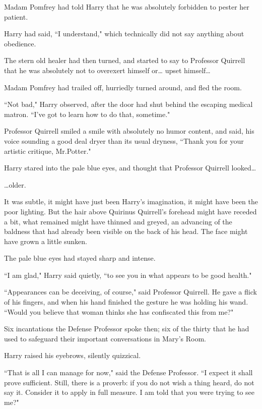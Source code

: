 Madam Pomfrey had told Harry that he was absolutely forbidden to pester her patient.

Harry had said, ``I understand," which technically did not say anything about obedience.

The stern old healer had then turned, and started to say to Professor Quirrell that he was absolutely not to overexert himself or{\ldots} upset himself{\ldots}

Madam Pomfrey had trailed off, hurriedly turned around, and fled the room.

``Not bad," Harry observed, after the door had shut behind the escaping medical matron. ``I've got to learn how to do that, sometime."

Professor Quirrell smiled a smile with absolutely no humor content, and said, his voice sounding a good deal dryer than its usual dryness, ``Thank you for your artistic critique, Mr.\?Potter."

Harry stared into the pale blue eyes, and thought that Professor Quirrell looked{\ldots}

{\ldots}older.

It was subtle, it might have just been Harry's imagination, it might have been the poor lighting. But the hair above Quirinus Quirrell's forehead might have receded a bit, what remained might have thinned and greyed, an advancing of the baldness that had already been visible on the back of his head. The face might have grown a little sunken.

The pale blue eyes had stayed sharp and intense.

``I am glad," Harry said quietly, ``to see you in what appears to be good health."

``Appearances can be deceiving, of course," said Professor Quirrell. He gave a flick of his fingers, and when his hand finished the gesture he was holding his wand. ``Would you believe that woman thinks she has confiscated this from me?"

Six incantations the Defense Professor spoke then; six of the thirty that he had used to safeguard their important conversations in Mary's Room.

Harry raised his eyebrows, silently quizzical.

``That is all I can manage for now," said the Defense Professor. ``I expect it shall prove sufficient. Still, there is a proverb: if you do not wish a thing heard, do not say it. Consider it to apply in full measure. I am told that you were trying to see me?"

